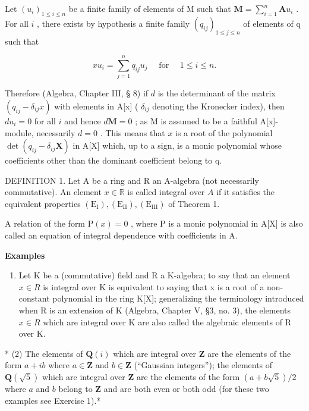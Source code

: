 Let \((u_{i})_{1\leqslant i\leqslant n}\) be a finite family of elements of M such that \(\mathbf{M} = \sum_{i = 1}^{n}\mathbf{A}u_{i}\) . For all \(i\) , there exists by hypothesis a finite family \((q_{ij})_{1\leqslant j\leqslant n}\) of elements of q such that

\[
x u _ {i} = \sum_ {j = 1} ^ {n} q _ {i j} u _ {j} \quad \text { for } \quad 1 \leqslant i \leqslant n.
\]

Therefore (Algebra, Chapter III, § 8) if \(d\) is the determinant of the matrix \((q_{ij} - \delta_{ij}x)\) with elements in A{[}x{]} ( \(\delta_{ij}\) denoting the Kronecker index), then \(du_i = 0\) for all \(i\) and hence \(d\mathbf{M} = 0\) ; as M is assumed to be a faithful A{[}x{]}-module, necessarily \(d = 0\) . This means that \(x\) is a root of the polynomial \(\det(q_{ij} - \delta_{ij}\mathbf{X})\) in A{[}X{]} which, up to a sign, is a monic polynomial whose coefficients other than the dominant coefficient belong to q.

DEFINITION 1. Let A be a ring and R an A-algebra (not necessarily commutative). An element \(x \in \mathbb{R}\) is called integral over \(A\) if it satisfies the equivalent properties \((\mathrm{E}_{\mathrm{I}}), (\mathrm{E}_{\mathrm{II}}), (\mathrm{E}_{\mathrm{III}})\) of Theorem 1.

A relation of the form \(\mathrm{P}(x)=0\) , where P is a monic polynomial in A{[}X{]} is also called an equation of integral dependence with coefficients in A.

\textbf{Examples}\par

\begin{enumerate}
\def\labelenumi{(\arabic{enumi})}
\tightlist
\item
  Let K be a (commutative) field and R a K-algebra; to say that an element \(x \in R\) is integral over K is equivalent to saying that x is a root of a non-constant polynomial in the ring K{[}X{]}; generalizing the terminology introduced when R is an extension of K (Algebra, Chapter V, §3, no. 3), the elements \(x \in R\) which are integral over K are also called the algebraic elements of R over K.
\end{enumerate}

* (2) The elements of \(\mathbf{Q}(i)\) which are integral over \(\mathbf{Z}\) are the elements of the form \(a + ib\) where \(a \in \mathbf{Z}\) and \(b \in \mathbf{Z}\) (``Gaussian integers''); the elements of \(\mathbf{Q}(\sqrt{5})\) which are integral over \(\mathbf{Z}\) are the elements of the form \((a + b\sqrt{5})/2\) where \(a\) and \(b\) belong to \(\mathbf{Z}\) and are both even or both odd (for these two examples see Exercise 1).*

